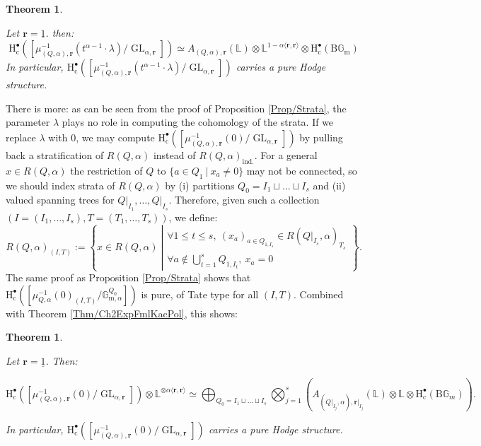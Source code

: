 \documentclass[11pt,english]{article}
\numberwithin{equation}{section}
\numberwithin{figure}{section}
\theoremstyle{definition}
\theoremstyle{plain}
\newtheorem{thm}[df]{Theorem}
\theoremstyle{remark}
\DeclareMathOperator{\GL}{GL}
\newcommand\rr{\mathbf{r}}
\newcommand\HH{\mathrm{H}}
\begin{document}
\begin{thm} \label{Thm/CohMomMapGenFib}

Let $\rr=\underline{1}$. then:\[
\HH_{\mathrm{c}}^{\bullet}\left(\left[\mu_{(Q,\alpha),\rr}^{-1}(t^{\alpha-1}\cdot\lambda)/\GL_{\alpha,\rr}\right]\right)
\simeq
A_{(Q,\alpha),\rr}(\mathbb{L})\otimes\mathbb{L}^{1-\alpha\langle\rr,\rr\rangle}\otimes\HH_{\mathrm{c}}^{\bullet}\left(\mathrm{B}\mathbb{G}_{\mathrm{m}}\right)
\]In particular, $\HH_{\mathrm{c}}^{\bullet}\left(\left[\mu_{(Q,\alpha),\rr}^{-1}(t^{\alpha-1}\cdot\lambda)/\GL_{\alpha,\rr}\right]\right)$
carries a pure Hodge structure.

\end{thm}

There is more: as can be seen from the proof of Proposition \ref{Prop/Strata},
the parameter $\lambda$ plays no role in computing the cohomology
of the strata. If we replace $\lambda$ with 0, we may compute $\HH_{\mathrm{c}}^{\bullet}\left(\left[\mu_{(Q,\alpha),\rr}^{-1}(0)/\GL_{\alpha,\rr}\right]\right)$
by pulling back a stratification of $R(Q,\alpha)$ instead of $R(Q,\alpha)_{\mathrm{ind.}}$.
For a general $x\in R(Q,\alpha)$ the restriction of $Q$ to $\{a\in Q_{1}\ \vert\ x_{a}\ne0\}$
may not be connected, so we should index strata of $R(Q,\alpha)$
by (i) partitions $Q_{0}=I_{1}\sqcup\ldots\sqcup I_{s}$ and (ii)
valued spanning trees for $Q\vert_{I_{1}},\ldots,Q\vert_{I_{s}}$.
Therefore, given such a collection $(I=(I_{1},\ldots,I_{s}),T=(T_{1},\ldots,T_{s}))$,
we define:\[
R(Q,\alpha)_{(I,T)}:=
\left\{
x\in R(Q,\alpha)\
\left\vert
\begin{array}{l}
\forall 1\leq t\leq s,\ (x_a)_{a\in Q_{1,I_s}}\in R(Q\vert_{I_s},\alpha)_{T_s} \\
\forall a\not\in\bigcup_{t=1}^sQ_{1,I_t},\ x_a=0
\end{array}
\right.
\right\}
.
\]The same proof as Proposition \ref{Prop/Strata} shows that $\HH_{\mathrm{c}}^{\bullet}\left(\left[\mu_{Q,\alpha}^{-1}(0)_{(I,T)}/\mathbb{G}_{\mathrm{m},\alpha}^{Q_{0}}\right]\right)$
is pure, of Tate type for all $(I,T)$. Combined with Theorem \ref{Thm/Ch2ExpFmlKacPol},
this shows:

\begin{thm} \label{Thm/CohIntgr}

Let $\rr=\underline{1}$. Then:

\[
\HH_{\mathrm{c}}^{\bullet}\left(\left[\mu_{(Q,\alpha),\rr}^{-1}(0)/\GL_{\alpha,\rr}\right]\right)
\otimes\mathbb{L}^{\otimes\alpha\langle\rr,\rr\rangle}
\simeq
\bigoplus_{Q_0=I_1\sqcup\ldots\sqcup I_s}
\bigotimes_{j=1}^s
\left(
A_{(Q\vert_{I_j},\alpha),\rr\vert_{I_j}}(\mathbb{L})\otimes\mathbb{L}\otimes \HH_{\mathrm{c}}^{\bullet}(\mathrm{B}\mathbb{G}_m)
\right).
\]

In particular, $\HH_{\mathrm{c}}^{\bullet}\left(\left[\mu_{(Q,\alpha),\rr}^{-1}(0)/\GL_{\alpha,\rr}\right]\right)$
carries a pure Hodge structure.

\end{thm}
\end{document}
